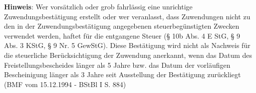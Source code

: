 \documentclass[12pt,ngerman]{scrartcl}
\begin{document}
{\singlespacing \scriptsize \textbf{Hinweis}: \newline
Wer vorsätzlich oder grob fahrlässig eine unrichtige Zuwendungsbestätigung erstellt oder wer veranlasst, dass Zuwendungen nicht
zu den in der Zuwendungsbestätigung angegebenen steuerbegünstigten Zwecken verwendet werden, haftet für die entgangene Steuer (§ 10b Abs. 4 E StG, § 9 Abs. 3 KStG, § 9 Nr. 5 GewStG). \newline
Diese Bestätigung wird nicht als Nachweis für die steuerliche Berücksichtigung der Zuwendung anerkannt, wenn das Datum des Freistellungsbescheides länger als 5 Jahre bzw. das Datum der vorläufigen Bescheinigung länger als 3 Jahre seit Ausstellung der Bestätigung zurückliegt (BMF vom 15.12.1994 - BStBl I S. 884)}
\end{document}
